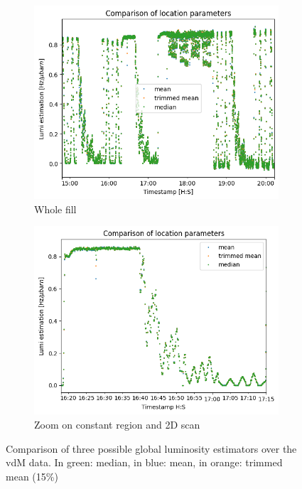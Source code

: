 \begin{figure}
    \centering
    \begin{subfigure}{0.48\textwidth}
    \includegraphics[width=\linewidth]{figures/comparison_location_whole.png}
    \caption{Whole fill}\label{fig:comparison_whole}
    \end{subfigure}
    \begin{subfigure}{0.48\textwidth}
    \includegraphics[width=\linewidth]{figures/comparison_location.png}
    \caption{Zoom on constant region and 2D scan}\label{fig:comparison_zoom}
    \end{subfigure}
    \caption{Comparison of three possible global luminosity estimators over the vdM data. In green: median, in blue: mean, in orange: trimmed mean (15\%)}
    \label{fig:lumi_estimator_location_param}
\end{figure}

